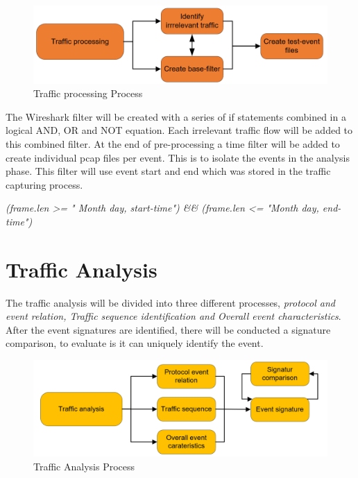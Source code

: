\begin{figure}[H]
    \centering
    \includegraphics[width=\textwidth]{figures/TrafficProcessingProcess.png}
    \caption{Traffic processing Process}
    \label{fig:TrafficProcessingProcess}
\end{figure}


The Wireshark filter will be created with a series of if statements combined in a logical AND, OR and NOT equation. Each irrelevant traffic flow will be added to this combined filter. At the end of pre-processing a time filter will be added to create individual pcap files per event. This is to isolate the events in the analysis phase. This filter will use event start and end which was stored in the traffic capturing process. 

\textit{(frame.len >= " Month day, start-time") \&\& (frame.len <= "Month day, end-time")}


\section{Traffic Analysis}
The traffic analysis will be divided into three different processes, \textit{protocol and event relation, Traffic sequence identification and Overall event characteristics}. After the event signatures are identified, there will be conducted a signature comparison, to evaluate is it can uniquely identify the event.

\begin{figure}[H]
    \centering
    \includegraphics[width=\textwidth]{figures/TrafficAnalysisProcess.png}
    \caption{Traffic Analysis Process}
    \label{fig:TrafficAnalysisProcess}
\end{figure}


